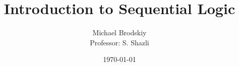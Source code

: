 


\pagestyle{fancy}

\title{Introduction to Sequential Logic}
\date{\today}
\author{Michael Brodskiy\\ \small Professor: S. Shazli}



\maketitle

\thispagestyle{fancy}

\newpage

